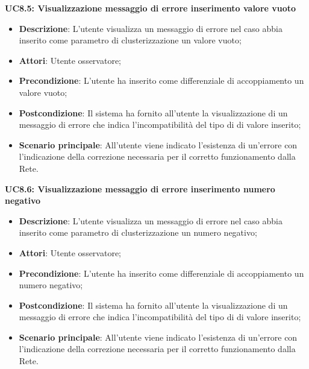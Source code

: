 \textbf{UC8.5: Visualizzazione messaggio di errore inserimento valore vuoto}\mbox{}
\label{UC8.5: Visualizzazione messaggio di errore per inserimento valore vuoto}
\noindent
\begin{itemize}
\item \textbf{Descrizione}: L'utente visualizza un messaggio di errore nel caso abbia inserito come parametro di clusterizzazione un valore vuoto;
\item \textbf{Attori}: Utente osservatore;
\item \textbf{Precondizione}: L'utente ha inserito come differenziale di accoppiamento un valore vuoto;
\item \textbf{Postcondizione}: Il sistema ha fornito all'utente la visualizzazione di un messaggio di errore che indica  l'incompatibilit\`a del tipo di  di valore inserito;
\item \textbf{Scenario principale}: All'utente viene indicato l'esistenza di un'errore con l'indicazione della correzione necessaria per il corretto funzionamento dalla Rete.
\end{itemize}

\textbf{UC8.6: Visualizzazione messaggio di errore inserimento numero negativo}\mbox{}
\label{UC8.6: Visualizzazione messaggio di errore per inserimento numero negativo}
\noindent
\begin{itemize}
\item \textbf{Descrizione}: L'utente visualizza un messaggio di errore nel caso abbia inserito come parametro di clusterizzazione un numero negativo;
\item \textbf{Attori}: Utente osservatore;
\item \textbf{Precondizione}: L'utente ha inserito come differenziale di accoppiamento un numero negativo;
\item \textbf{Postcondizione}: Il sistema ha fornito all'utente la visualizzazione di un messaggio di errore che indica  l'incompatibilit\`a del tipo di  di valore inserito;
\item \textbf{Scenario principale}: All'utente viene indicato l'esistenza di un'errore con l'indicazione della correzione necessaria per il corretto funzionamento dalla Rete.
\end{itemize}

